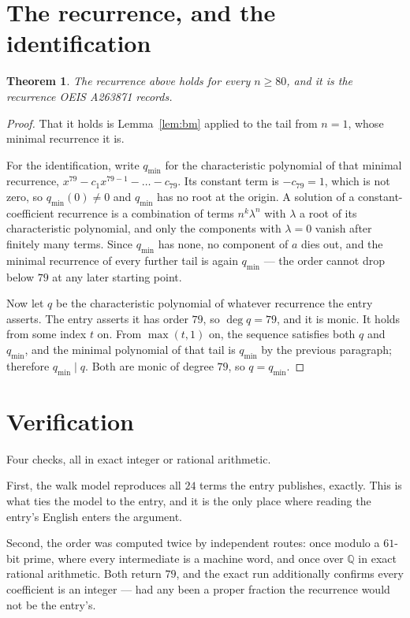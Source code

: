 \documentclass[11pt,a4paper]{article}
\theoremstyle{plain}
\newtheorem{theorem}{Theorem}
\theoremstyle{definition}
\begin{document}
\section{The recurrence, and the identification}

\begin{theorem}
The recurrence above holds for every $n\ge80$, and it is the recurrence OEIS A263871 records.
\end{theorem}

\begin{proof}
That it holds is Lemma~\ref{lem:bm} applied to the tail from $n=1$, whose minimal
recurrence it is.

For the identification, write $q_{\min}$ for the characteristic polynomial of that minimal
recurrence, $x^{79}-c_1x^{79-1}-\dots-c_{79}$. Its constant term is
$-c_{79}=1$, which is not zero, so $q_{\min}(0)\neq0$ and $q_{\min}$ has no
root at the origin. A solution of a constant-coefficient recurrence is a combination of terms
$n^{k}\lambda^{n}$ with $\lambda$ a root of its characteristic polynomial, and only the
components with $\lambda=0$ vanish after finitely many terms. Since $q_{\min}$ has none, no
component of $a$ dies out, and the minimal recurrence of every further tail is again
$q_{\min}$ --- the order cannot drop below $79$ at any later starting point.

Now let $q$ be the characteristic polynomial of whatever recurrence the entry asserts. The
entry asserts it has order $79$, so $\deg q=79$, and it is monic. It holds from some
index $t$ on. From $\max(t,1)$ on, the sequence satisfies both $q$ and $q_{\min}$, and
the minimal polynomial of that tail is $q_{\min}$ by the previous paragraph; therefore
$q_{\min}\mid q$. Both are monic of degree $79$, so $q=q_{\min}$.
\end{proof}

\section{Verification}

Four checks, all in exact integer or rational arithmetic.

First, the walk model reproduces all $24$ terms the entry publishes, exactly. This is
what ties the model to the entry, and it is the only place where reading the entry's English
enters the argument.

Second, the order was computed twice by independent routes: once modulo a $61$-bit prime, where
every intermediate is a machine word, and once over $\mathbb{Q}$ in exact rational arithmetic.
Both return $79$, and the exact run additionally confirms every coefficient is an integer
--- had any been a proper fraction the recurrence would not be the entry's.
\end{document}
